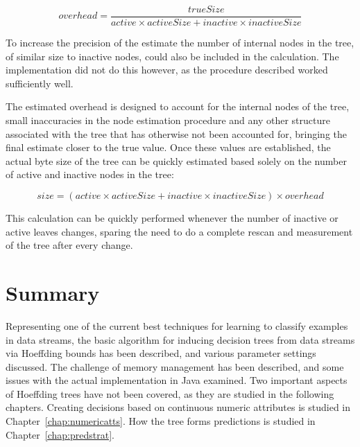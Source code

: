 \begin{equation} \label{eq:fastmemoverhead}
overhead = \frac{trueSize}{active \times activeSize + inactive \times inactiveSize}
\end{equation}

To increase the precision of the estimate the number of internal nodes in the tree, of similar size to inactive nodes, could also be included in the calculation. The implementation did not do this however, as the procedure described worked sufficiently well.

The estimated overhead is designed to account for the internal nodes of the tree, small inaccuracies in the node estimation procedure and any other structure associated with the tree that has otherwise not been accounted for, bringing the final estimate closer to the true value. Once these values are established, the actual byte size of the tree can be quickly estimated based solely on the number of active and inactive nodes in the tree:

\begin{equation} \label{eq:fastmemcalc}
size = (active \times activeSize + inactive \times inactiveSize) \times overhead
\end{equation}

This calculation can be quickly performed whenever the number of inactive or active leaves changes, sparing the need to do a complete rescan and measurement of the tree after every change.

\BEGINOMIT
\section{Summary}

Representing one of the current best techniques for learning to classify examples in data streams, the basic algorithm for inducing decision trees from data streams via Hoeffding bounds has been described, and various parameter settings discussed. The challenge of memory management has been described, and some issues with the actual implementation in Java examined. 
Two important aspects of Hoeffding trees have not been covered, as they are studied in the following chapters.
Creating decisions based on continuous numeric attributes is studied in Chapter~\ref{chap:numericatts}. How the tree forms predictions is studied in Chapter~\ref{chap:predstrat}. 

\ENDOMIT



